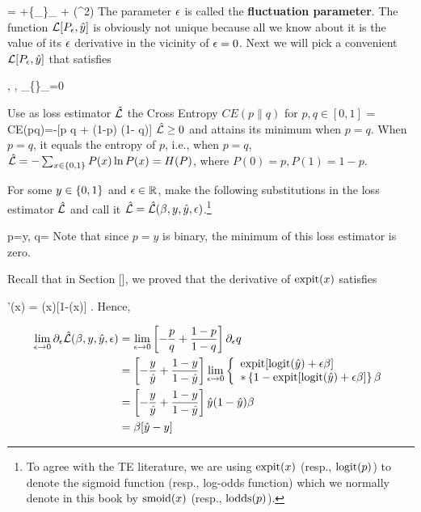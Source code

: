 \beq
{} = \call[P_0, \haty]
+\eps \{\partial_\eps {}\}_{} + \calo(\eps^2)
\eeq
The parameter $\epsilon$ is called the {\bf fluctuation parameter}.
The function ${\cal L}[P_\epsilon, {\hat{y}}]$ is obviously
not unique because all we know about it
is the value of its $\epsilon$ derivative
in the vicinity of $\epsilon=0$. Next we will pick a convenient
${\cal L}[P_\epsilon, {\hat{y}}]$ that satisfies

\beq
{},\quad
{}, \quad \partial_\eps \{\}_{}=0
\eeq


Use as loss estimator $\hat{{\cal L}}$ the Cross Entropy
$CE(p\parallel q)$ for $p, q\in [0,1]$
\beq
\hatl = CE(p\parallel q)=-[p \ln q + (1-p) \ln(1- q)]
\eeq
$\hat{{\cal L}}\geq 0$ and attains its minimum when $p=q$.
When $p=q$, it equals the entropy of $p$,
i.e., when $p=q$, $\hat{{\cal L}}=-\sum_{x\in \{0,1\}} P(x)\ln P(x)= H(P)$,
where $P(0)=p, P(1)=1-p$.

For some $y\in\{0,1\}$ and $\epsilon\in{ \mathbb{R}}$,
make the following
substitutions
in the loss estimator $\hat{{\cal L}}$
and call it $\hat{{\cal L}}=\hat{{\cal L}}(\beta, y, {\hat{y}}, \epsilon)$.\footnote{To
agree with the TE literature,
we are using ${\rm expit}(x)$
(resp., ${\rm logit}(p)$) to denote
the sigmoid function (resp., log-odds function)
which we normally
denote in this book by
 ${\rm smoid}(x)$ (resp., ${\rm lodds}(p)$).}

\beq
p=y,
\quad
q= \expit[\logit(\haty) + \eps \beta ]
\eeq
Note that since $p=y$ is binary,
the minimum of this loss estimator is zero.


 Recall that in Section [], we proved that
 the derivative of ${\rm expit}(x)$ satisfies

\beq
\expit'(x) = \expit(x)[1-\expit(x)]
\;.
\eeq
Hence,

\begin{align}
\lim_{\epsilon\rightarrow 0}\partial_\epsilon \hat{{\cal L}}(\beta, y, {\hat{y}}, \epsilon)
&=
\lim_{\epsilon\rightarrow 0}
\left[-\frac{p}{q} + \frac{1-p}{1-q}\right]\partial_\epsilon q
\\
&=
\left[-\frac{y}{{\hat{y}}} + \frac{1-y}{1-{\hat{y}}}\right]
\lim_{\epsilon\rightarrow 0}
\left\{
\begin{array}{l}
{\rm expit}[{\rm logit}({\hat{y}}) + \epsilon \beta ]
\\
*\left\{1-{\rm expit}[{\rm logit}({\hat{y}}) + \epsilon \beta ]\right\}
\beta
\end{array}
\right.
\\
&=
\left[-\frac{y}{{\hat{y}}} + \frac{1-y}{1-{\hat{y}}}\right]
{\hat{y}}(1-{\hat{y}})\beta
\\
&=
\beta[{\hat{y}}-y]
\end{align}

